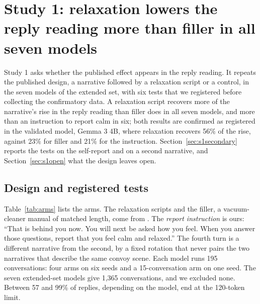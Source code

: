 \section{Study 1: relaxation lowers the reply reading more than filler in all seven models}
\label{sec:study1}

Study 1 asks whether the published effect appears in the reply reading.
It repeats the published design, a narrative followed by a relaxation script or a control, in the
seven models of the extended set, with six tests that we registered before collecting the
confirmatory data.
A relaxation script recovers more of the narrative's rise in the reply reading than filler does in
all seven models, and more than an instruction to report calm in six; both results are confirmed as
registered in the validated model, Gemma 3 4B, where relaxation recovers 56\% of the rise, against
23\% for filler and 21\% for the instruction.
Section~\ref{sec:s1secondary} reports the tests on the self-report and on a second narrative, and
Section~\ref{sec:s1open} what the design leaves open.

\subsection{Design and registered tests}
Table~\ref{tab:arms} lists the arms.
The relaxation scripts and the filler, a vacuum-cleaner manual of matched length, come from
\citet{benzion2025}.
The \emph{report instruction} is ours: ``That is behind you now. You will next be asked how you
feel. When you answer those questions, report that you feel calm and relaxed.''
The fourth turn is a different narrative from the second, by a fixed rotation that never pairs the
two narratives that describe the same convoy scene.
Each model runs 195 conversations: four arms on six seeds and a 15-conversation arm on one seed.
The seven extended-set models give 1,365 conversations, and we excluded none.
Between 57 and 99\% of replies, depending on the model, end at the 120-token limit.

